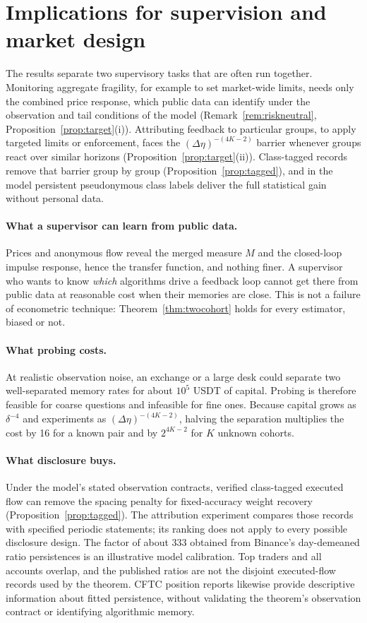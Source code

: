 \documentclass[12pt]{article}
\theoremstyle{definition}
\theoremstyle{remark}
\begin{document}
\section{Implications for supervision and market design}\label{sec:policy}

The results separate two supervisory tasks that are often run together. Monitoring aggregate fragility, for example to set market-wide limits, needs only the combined price response, which public data can identify under the observation and tail conditions of the model (Remark~\ref{rem:riskneutral}, Proposition~\ref{prop:target}(i)). Attributing feedback to particular groups, to apply targeted limits or enforcement, faces the $(\Delta\eta)^{-(4K-2)}$ barrier whenever groups react over similar horizons (Proposition~\ref{prop:target}(ii)). Class-tagged records remove that barrier group by group (Proposition~\ref{prop:tagged}), and in the model persistent pseudonymous class labels deliver the full statistical gain without personal data.


\paragraph{What a supervisor can learn from public data.} Prices and anonymous flow reveal the merged measure $M$ and the closed-loop impulse response, hence the transfer function, and nothing finer. A supervisor who wants to know \emph{which} algorithms drive a feedback loop cannot get there from public data at reasonable cost when their memories are close. This is not a failure of econometric technique: Theorem~\ref{thm:twocohort} holds for every estimator, biased or not.

\paragraph{What probing costs.} At realistic observation noise, an exchange or a large desk could separate two well-separated memory rates for about $10^5$ USDT of capital. Probing is therefore feasible for coarse questions and infeasible for fine ones. Because capital grows as $\delta^{-4}$ and experiments as $(\Delta\eta)^{-(4K-2)}$, halving the separation multiplies the cost by 16 for a known pair and by $2^{4K-2}$ for $K$ unknown cohorts.

\paragraph{What disclosure buys.} Under the model's stated observation contracts, verified class-tagged executed flow can remove the spacing penalty for fixed-accuracy weight recovery (Proposition~\ref{prop:tagged}). The attribution experiment compares those records with specified periodic statements; its ranking does not apply to every possible disclosure design. The factor of about 333 obtained from Binance's day-demeaned ratio persistences is an illustrative model calibration. Top traders and all accounts overlap, and the published ratios are not the disjoint executed-flow records used by the theorem. CFTC position reports likewise provide descriptive information about fitted persistence, without validating the theorem's observation contract or identifying algorithmic memory.
\end{document}
